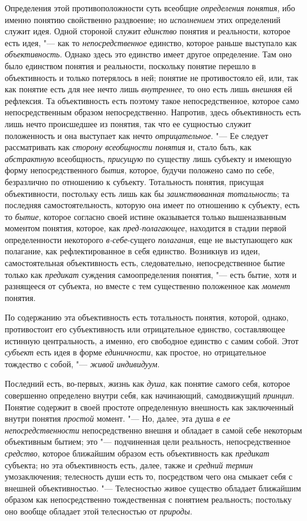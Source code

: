 Определения этой противоположности суть всеобщие
{\em определения понятия},
ибо именно понятию свойственно раздвоение; но
{\em исполнением} этих
определений служит идея. Одной стороной служит
{\em единство} понятия и
реальности, которое есть идея, "--- как то
{\em непосредственное}
единство, которое раньше выступало как
{\em объективность}.
Однако здесь это единство имеет другое определение. Там оно
было единством понятия и реальности, поскольку понятие перешло в
объективность и только потерялось в ней; понятие не противостояло ей, или,
так как понятие есть для нее нечто лишь
{\em внутреннее}, то оно
есть лишь {\em внешняя}
ей рефлексия. Та объективность есть поэтому такое
непосредственное, которое само непосредственным образом непосредственно.
Напротив, здесь объективность есть лишь нечто происшедшее из понятия, так
что ее сущностью служит положенность и она выступает как нечто
{\em отрицательное}. "--- Ее
следует рассматривать как {\em сторону
всеобщности понятия} и, стало бьть, как
{\em абстрактную}
всеобщность,
{\em присущую} по
существу лишь субъекту и имеющую форму непосредственного
{\em бытия}, которое,
будучи положено само по себе, безразлично по отношению к субъекту.
Тотальность понятия, присущая объективности, постольку есть лишь как бы
{\em заимствованная тотальность};
та последняя самостоятельность, которую она
имеет по отношению к субъекту, есть то
{\em бытие}, которое
согласно своей истине оказывается только вышеназванным моментом понятия,
которое, как {\em пред-полагающее},
находится в стадии первой определенности некоторого
{\em в-себе}{}-сущего
{\em полагания}, еще не
выступающего {\em как}
полагание, как рефлектированное в себя единство. Возникнув
из идеи, самостоятельная объективность есть, следовательно,
непосредственное бытие только как
{\em предикат} суждения
самоопределения понятия, "--- есть бытие, хотя и разнящееся от
субъекта, но вместе с тем существенно положенное как
{\em момент} понятия.

По содержанию эта объективность есть тотальность понятия,
которой, однако, противостоит его субъективность или отрицательное
единство, составляющее истинную центральность, а именно, его свободное
единство с самим собой. Этот
{\em субъект} есть идея в
форме {\em единичности},
как простое, но отрицательное тождество с собой, "---
{\em живой индивидуум}.

Последний есть, во-первых, жизнь как
{\em душа}, как понятие
самого себя, которое совершенно определено внутри себя, как начинающий,
самодвижущий {\em принцип}.
Понятие содержит в своей простоте определенную внешность как
заключенный внутри понятия
{\em простой} момент. "---
Но, далее, эта душа {\em в
ее непосредственности} непосредственно внешня и обладает в
самой себе некоторым объективным бытием; это "--- подчиненная
цели реальность, непосредственное
{\em средство}, которое
ближайшим образом есть объективность как
{\em предикат} субъекта;
но эта объективность есть, далее, также и
{\em средний термин}
умозаключения; телесность души есть то, посредством чего она
смыкает себя с внешней объективностью. "--- Телесностью живое
существо обладает ближайшим образом как непосредственно тождественная с
понятием реальность; постольку оно вообще обладает этой телесностью от
{\em природы}.

